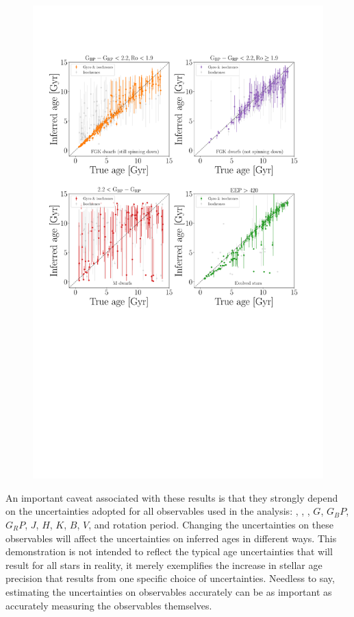 \begin{figure}
    \includegraphics[width=1\textwidth]{simulation_results}
\label{fig:simulation_results}
\end{figure}

An important caveat associated with these results is that they strongly depend
on the uncertainties adopted for all observables used in the analysis: \teff,
\feh, \logg, $G$, $G_BP$, $G_RP$, $J$, $H$, $K$, $B$, $V$, and rotation
period.
Changing the uncertainties on these observables will affect the uncertainties
on inferred ages in different ways.
This demonstration is not intended to reflect the typical age uncertainties
that will result for all stars in reality, it merely exemplifies the increase
in stellar age precision that results from one specific choice of
uncertainties.
Needless to say, estimating the uncertainties on observables accurately can be
as important as accurately measuring the observables themselves.

